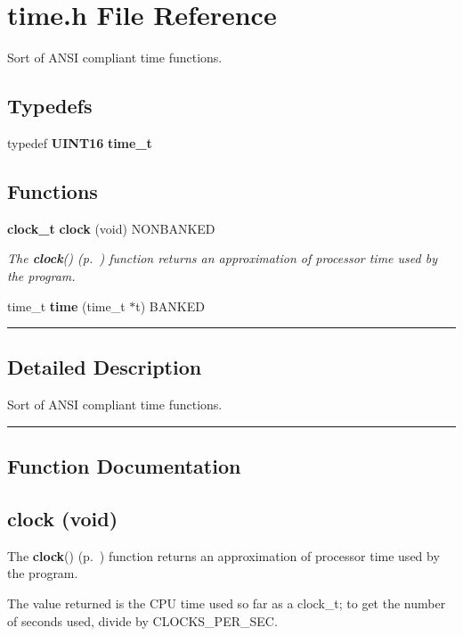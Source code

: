 \section{time.h File Reference}
\label{time.h}
Sort of ANSI compliant time functions. 


\subsection*{Typedefs}
\begin{CompactItemize}
\item 
\label{time.h_a3}
typedef {\bf UINT16} {\bf time\_\-t}
\end{CompactItemize}
\subsection*{Functions}
\begin{CompactItemize}
\item 
{\bf clock\_\-t} {\bf clock} (void) NONBANKED
\begin{CompactList}\small\item\em The {\bf clock}() {\rm (p.~\pageref{time.h_a1})} function returns an approximation of processor time used by the program.\item\end{CompactList}

\item 
\label{time.h_a2}
time\_\-t {\bf time} (time\_\-t $\ast$t) BANKED
\end{CompactItemize}
\vspace{0.4cm}\hrule\vspace{0.2cm}
\subsection*{Detailed Description}
Sort of ANSI compliant time functions.\vspace{0.4cm}\hrule\vspace{0.2cm}
\subsection*{Function Documentation}
\label{time.h_a1}
\subsection{ clock (void)}

The {\bf clock}() {\rm (p.~\pageref{time.h_a1})} function returns an approximation of processor time used by the program.

The value returned is the CPU time used so far as a clock\_\-t; to get the number of seconds used, divide by CLOCKS\_\-PER\_\-SEC. 